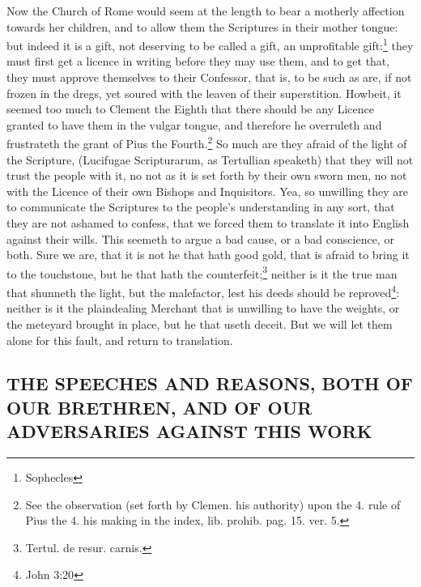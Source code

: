 Now the Church of Rome would seem at the length to bear a motherly affection towards her children, and to allow them the Scriptures in their mother tongue: but indeed it is a gift, not deserving to be called a gift, an unprofitable gift:\footnote{Sophecles} they must first get a licence in writing before they may use them, and to get that, they must approve themselves to their Confessor, that is, to be such as are, if not frozen in the dregs, yet soured with the leaven of their superstition. Howbeit, it seemed too much to Clement the Eighth that there should be any Licence granted to have them in the vulgar tongue, and therefore he overruleth and frustrateth the grant of Pius the Fourth.\footnote{See the observation (set forth by Clemen. his authority) upon the 4. rule of Pius the 4. his making in the index, lib. prohib. pag. 15. ver. 5.} So much are they afraid of the light of the Scripture, (Lucifugae Scripturarum, as Tertullian speaketh) that they will not trust the people with it, no not as it is set forth by their own sworn men, no not with the Licence of their own Bishops and Inquisitors. Yea, so unwilling they are to communicate the Scriptures to the people's understanding in any sort, that they are not ashamed to confess, that we forced them to translate it into English against their wills. This seemeth to argue a bad cause, or a bad conscience, or both. Sure we are, that it is not he that hath good gold, that is afraid to bring it to the touchstone, but he that hath the counterfeit;\footnote{Tertul. de resur. carnis.} neither is it the true man that shunneth the light, but the malefactor, lest his deeds should be reproved\footnote{John 3:20}: neither is it the plaindealing Merchant that is unwilling to have the weights, or the meteyard brought in place, but he that useth deceit. But we will let them alone for this fault, and return to translation.

\subsection{THE SPEECHES AND REASONS, BOTH OF OUR BRETHREN, AND OF OUR ADVERSARIES AGAINST THIS WORK}

